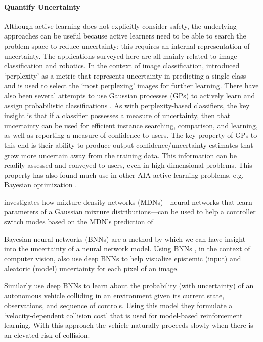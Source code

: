 \paragraph{Quantify Uncertainty} \label{sec:QU}

Although active learning does not explicitly consider safety, the underlying approaches can be useful because active learners need to be able to search the problem space to reduce uncertainty; this requires an internal representation of uncertainty. The applications surveyed here are all mainly related to image classification and robotics. In the context of image classification, \citet{Paul2011-vr} introduced `perplexity' as a metric that represents uncertainty in predicting a single class and is used to select the `most perplexing' images for further learning. There have also been several attempts to use Gaussian processes (GPs) to actively learn and assign probabilistic classifications \cite{MacKay1992-sp,Triebel2016-kj,Triebel2013-ow,Triebel2013-ku,Grimmett2013-gj,Grimmett2016-yc,Berczi2015-rd,Dequaire2016-kh}. As with perplexity-based classifiers, the key insight is that if a classifier possesses a measure of uncertainty, then that uncertainty can be used for efficient instance searching, comparison, and learning, as well as reporting a measure of confidence to users. The key property of GPs to this end is their ability to produce output confidence/uncertainty estimates that grow more uncertain away from the training data. This information can be readily assessed and conveyed to users, even in high-dimensional problems. This property has also found much use in other AIA active learning problems, e.g. Bayesian optimization \cite{Snoek2012-tt, Brochu2010-tj,Israelsen2017-zb}. 

\citet{Choi2017-th} investigates how mixture density networks (MDNs)---neural networks that learn parameters of a Gaussian mixture distributions---can be used to help a controller switch modes based on the MDN's prediction of 

Bayesian neural networks (BNNs) are a method by which we can have insight into the uncertainty of a neural network model. Using BNNs \citet{Kendall2017-ry}, in the context of computer vision, also use deep BNNs to help visualize epistemic (input) and aleatoric (model) uncertainty for each pixel of an image. 

Similarly \citet{Kahn2017-vy} use deep BNNs to learn about the probability (with uncertainty) of an autonomous vehicle colliding in an environment given its current state, observations, and sequence of controls. Using this model they formulate a `velocity-dependent collision cost' that is used for model-based reinforcement learning. With this approach the vehicle naturally proceeds slowly when there is an elevated risk of collision. 

